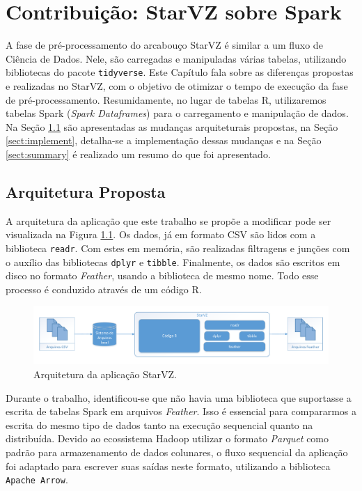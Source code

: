 \chapter{Contribuição: StarVZ sobre Spark} \label{ch:contribution}

A fase de pré-processamento do arcabouço StarVZ é similar a um fluxo de Ciência 
de Dados. Nele, são carregadas e manipuladas várias tabelas, utilizando 
bibliotecas do pacote \texttt{tidyverse}. Este Capítulo fala sobre as diferenças 
propostas e realizadas no StarVZ, com o objetivo de otimizar o tempo de 
execução da fase de pré-processamento. Resumidamente, no lugar de tabelas R, 
utilizaremos tabelas Spark (\emph{Spark Dataframes}) para o carregamento e 
manipulação de dados. Na Seção \ref{sect:arch} são apresentadas as mudanças 
arquiteturais propostas, na Seção \ref{sect:implement}, detalha-se a 
implementação dessas mudanças e na Seção \ref{sect:summary} é realizado um 
resumo do que foi apresentado.

\section{Arquitetura Proposta} \label{sect:arch}

A arquitetura da aplicação que este trabalho se propõe a modificar pode ser 
visualizada na Figura \ref{fig:starvz-app}. Os dados, já em formato 
CSV são lidos com a biblioteca \texttt{readr}. Com estes em memória, 
são realizadas filtragens e junções com o auxílio das bibliotecas \texttt{dplyr} 
e \texttt{tibble}. Finalmente, os dados são escritos em disco no formato 
\textit{Feather}, usando a biblioteca de mesmo nome. Todo esse processo é 
conduzido através de um código R.

\begin{figure}[ht]
 \centerline{\includegraphics[width=1\textwidth]{./img/starvz-arch.pdf}}
 \caption{Arquitetura da aplicação StarVZ.}
 \label{fig:starvz-app}
\end{figure}

Durante o trabalho, identificou-se que não havia uma biblioteca que suportasse a 
escrita de tabelas Spark em arquivos \textit{Feather}. Isso é essencial para 
compararmos a escrita do mesmo tipo de dados tanto na execução sequencial quanto 
na distribuída. Devido ao ecossistema Hadoop utilizar o formato \textit{Parquet} 
\cite{ref:parquet} como padrão para armazenamento de dados colunares, o fluxo 
sequencial da aplicação foi adaptado para escrever suas saídas neste formato, 
utilizando a biblioteca \texttt{Apache Arrow}.

